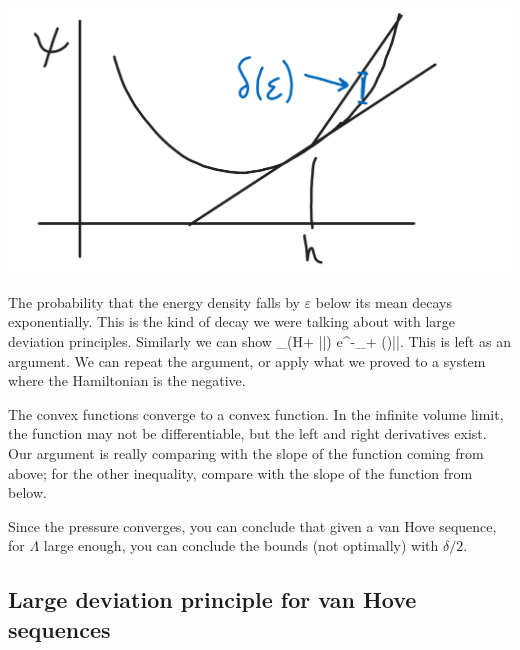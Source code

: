\begin{center}\includegraphics[scale=.25]{images/9-1}\end{center}

The probability that the energy density falls by $\varepsilon$ below its mean decays exponentially. This is the kind of decay we were talking about with large deviation principles.
Similarly we can show 
\be
{}_\beta (H\ge \left{}\right\rangle + \varepsilon|\Lambda|) \le e^{-\delta_+ (\varepsilon)|\Lambda|}.
\ee
This is left as an argument. 
We can repeat the argument, or apply what we proved to a system where the Hamiltonian is the negative.

The convex functions converge to a convex function. %
In the infinite volume limit, the function may not be differentiable, but the left and right derivatives exist. Our argument is really comparing with the slope of the function coming from above; for the other inequality, compare with the slope of the function from below.

Since the pressure converges, 
you can conclude that given a van Hove sequence, for $\Lambda$ large enough, you can conclude the bounds (not optimally) with $\delta/2$. 

\subsection{Large deviation principle for van Hove sequences}

